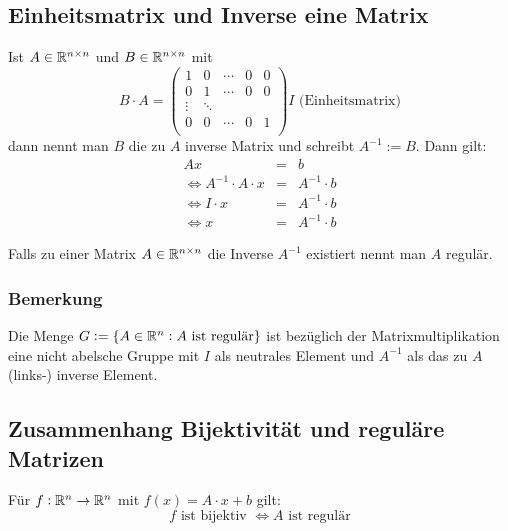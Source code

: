 \subsection{Einheitsmatrix und Inverse eine Matrix}
Ist $A \in \mathbb{R}^{n \times n}$ und $B \in \mathbb{R}^{n \times n}$ mit
\begin{equation*}
    B \cdot A =
    \begin{pmatrix}
        1 & 0 & \cdots & 0 & 0\\
        0 & 1 & \cdots & 0 & 0\\
        \vdots & \ddots \\
        0 & 0 & \cdots & 0 & 1\\
    \end{pmatrix}
    I \text{ (Einheitsmatrix)}
\end{equation*}
dann nennt man $B$ die zu $A$ inverse Matrix und schreibt $A^{-1} := B$.
Dann gilt:
\begin{eqnarray*}
    A x &=& b \\
    \Leftrightarrow A^{-1} \cdot A \cdot x &=& A^{-1} \cdot b\\
    \Leftrightarrow I \cdot x &=& A^{-1} \cdot b\\
    \Leftrightarrow x &=& A^{-1} \cdot b
\end{eqnarray*}

Falls zu einer Matrix $A \in \mathbb{R}^{n \times n}$ die Inverse $A^{-1}$ existiert
nennt man $A$ regulär.

\subsubsection{Bemerkung}
Die Menge $G := \{ A \in \mathbb{R}^n: A \text{ ist regulär} \}$ ist bezüglich der
Matrixmultiplikation eine nicht abelsche Gruppe mit $I$ als neutrales Element
und $A^{-1}$ als das zu $A$ (links-) inverse Element.

\subsection{Zusammenhang Bijektivität und reguläre Matrizen}
Für $f: \mathbb{R}^n \rightarrow \mathbb{R}^n$ mit $f(x) = A \cdot x + b$ gilt:
\begin{equation*}
    f \text{ ist bijektiv } \Leftrightarrow A \text{ ist regulär}
\end{equation*}

